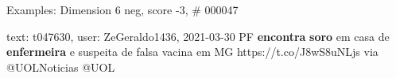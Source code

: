 \begin{frame}{Examples: Dimension 6 neg, score -3, \# 000047}
\footnotesize
\begin{alertblock}{text: t047630, user: ZeGeraldo1436, 2021-03-30}
PF \textbf{encontra} \textbf{soro} em casa de \textbf{enfermeira} e suspeita de 
falsa vacina em MG https://t.co/J8wS8uNLjs via @UOLNoticias @UOL 
\end{alertblock}
\end{frame}
